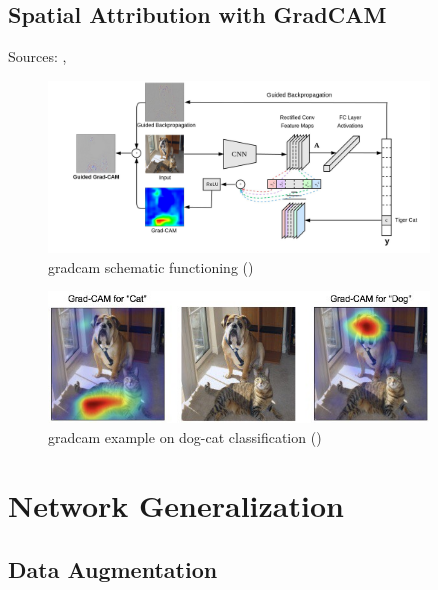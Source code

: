 \subsection{Spatial Attribution with GradCAM}
\label{subsec:gradcam-theory}

Sources: \cite{Selvaraju_2019}, \cite{gradcam_medium}

\begin{figure}[!htb]
	\centering
	\includegraphics[width=0.9\textwidth]{"contents/images/gradcam/02-gradcam-schema"}
	\caption[\gls{gradcam} schematic functioning]{\gls{gradcam} schematic functioning (\cite{Selvaraju_2019})}
	\label{fig:gradcam-schema}
\end{figure}

\begin{figure}[!htb]
\centering
\includegraphics[width=0.9\textwidth]{"contents/images/gradcam/02-gradcam-catdog"}
\caption[\gls{gradcam} example on dog-cat classification]{\gls{gradcam} example on dog-cat classification (\cite{Selvaraju_2019})}
\label{fig:gradcam-catdog}
\end{figure}




\section{Network Generalization}
\label{sec:network-generalization}



\subsection{Data Augmentation}
\label{subsec:data-augmentation}



